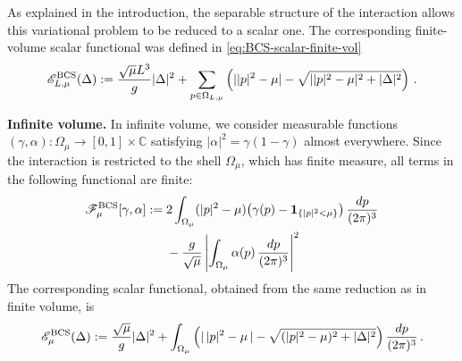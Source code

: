 \documentclass[11pt]{amsart}
\theoremstyle{definition}
\numberwithin{equation}{section}
\newcommand{\C}{\mathbb C}
\newcommand{\dpm}{\frac{dp}{(2\pi)^3}}
\newcommand{\1}{\mathbf 1}
\begin{document}
As explained in the introduction, the separable structure of the interaction allows this variational problem to be reduced to a scalar one. The corresponding finite-volume scalar functional was defined in \eqref{eq:BCS-scalar-finite-vol}
\begin{equation*}
    \mathscr{E}_{L,\mu}^{\rm BCS}(\Delta):= \frac{\sqrt{\mu}L^3}{g}|\Delta|^2 + \sum_{p \in \Omega_{L, \mu}}\left(||p|^2 - \mu| - \sqrt{||p|^2 - \mu|^2 + |\Delta|^2} \right)\,.
\end{equation*}

\textbf{Infinite volume.}
In infinite volume, we consider measurable functions $(\gamma,\alpha):\Omega_\mu\to[0,1]\times\C$ satisfying $|\alpha|^2=\gamma(1-\gamma)$ almost everywhere. Since the interaction is restricted to the shell $\Omega_\mu$, which has finite measure, all terms in the following functional are finite:
\begin{align}
 \mathscr F^{\rm BCS}_{\mu}[\gamma,\alpha]
 :={}&
 2\int_{\Omega_\mu}
 (|p|^2-\mu)
 \bigl(\gamma(p)-\1_{\{|p|^2<\mu\}}\bigr)\,\dpm
 \nonumber\\
 &-\frac{g}{\sqrt\mu}
 \left|\int_{\Omega_\mu}\alpha(p)\,\dpm\right|^2
 \label{eq:infinite-gamma-alpha}
\end{align}
The corresponding scalar functional, obtained from the same reduction as in finite volume, is
\begin{equation}
  \mathscr E_{\mu}^{\rm BCS}(\Delta) := \frac{\sqrt\mu}{g}|\Delta|^2
 +\int_{\Omega_\mu}
 \left(|\,|p|^2-\mu\,|-\sqrt{(|p|^2-\mu)^2+|\Delta|^2}\right)
 \frac{dp}{(2\pi)^3}\,.
\end{equation}
\end{document}
